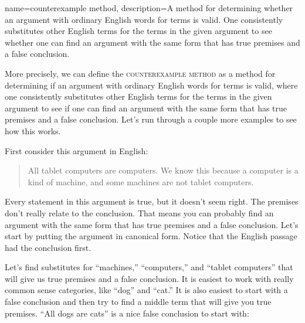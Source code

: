 {
name=counterexample method,
description={A method for determining whether an argument with ordinary English words for terms is valid. One consistently substitutes other English terms for the terms in the given argument to see whether one can find an argument with the same form that has true premises and a false conclusion.}
}

More precisely, we can define the \textsc{\gls{counterexample method}} \label{def:counter_example_method} as a method for determining if an argument with ordinary English words for terms is valid, where one consistently substitutes other English terms for the terms in the given argument to see if one can find an argument with the same form that has true premises and a false conclusion. Let's run through a couple more examples to see how this works.

First consider this argument in English:

\begin{quotation}
\noindent  All tablet computers are computers. We know this because a computer is a kind of machine, and some machines are not tablet computers.
\end{quotation}

Every statement in this argument is true, but it doesn't seem right. The premises don't really relate to the conclusion. That means you can probably find an argument with the same form that has true premises and a false conclusion. Let's start by putting the argument in canonical form. Notice that the English passage had the conclusion first.

\begin{kormanize}
\end{kormanize}

Let's find substitutes for ``machines,'' ``computers,'' and ``tablet computers'' that will give us true premises and a false conclusion. It is easiest to work with really common sense categories, like ``dog'' and ``cat.'' It is also easiest to start with a false conclusion and then try to find a middle term that will give you true premises. ``All dogs are cats'' is a nice false conclusion to start with:

\begin{kormanize}
 \end{kormanize}

